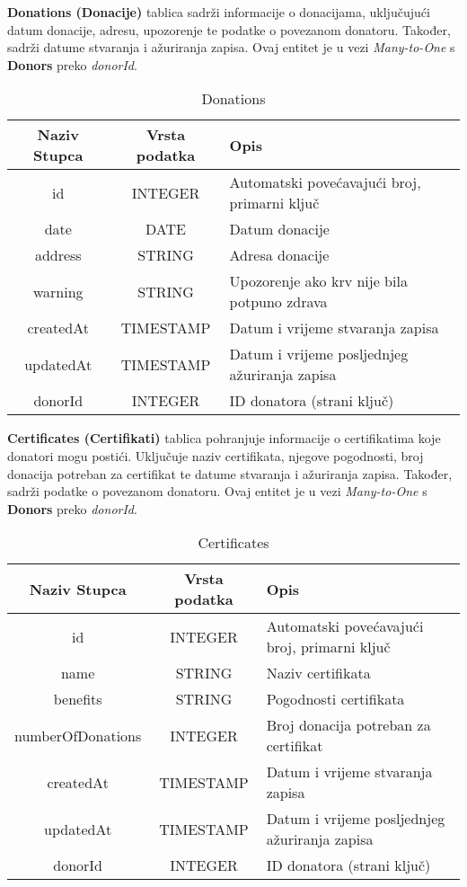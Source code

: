 \documentclass[12pt]{article}
\begin{document}
\noindent\textbf{Donations (Donacije)} tablica sadrži informacije o donacijama, uključujući datum donacije, adresu, upozorenje te podatke o povezanom donatoru. Također, sadrži datume stvaranja i ažuriranja zapisa. Ovaj entitet je u vezi \textit{Many-to-One} s \textbf{Donors} preko \textit{donorId}.
\begin{table}[H]
    \renewcommand{\arraystretch}{2}
    \centering
     \begin{tabularx}{1\textwidth}{|c|c|X|}
    \hline
    \textbf{Naziv Stupca} & \textbf{Vrsta podatka} & \textbf{Opis} \\
    \hline
    id & INTEGER & Automatski povećavajući broj, primarni ključ\\
    \hline
    date & DATE & Datum donacije \\
    \hline
    address & STRING & Adresa donacije \\
    \hline
    warning & STRING & Upozorenje ako krv nije bila potpuno zdrava \\
    \hline
    createdAt & TIMESTAMP & Datum i vrijeme stvaranja zapisa \\
    \hline
    updatedAt & TIMESTAMP & Datum i vrijeme posljednjeg ažuriranja zapisa \\
    \hline
    donorId & INTEGER & ID donatora (strani ključ) \\
    \hline
    \end{tabularx}
    \caption{Donations}
    \label{tab:my_label}
\end{table}
\clearpage %

\noindent\textbf{Certificates (Certifikati)} tablica pohranjuje informacije o certifikatima koje donatori mogu postići. Uključuje naziv certifikata, njegove pogodnosti, broj donacija potreban za certifikat te datume stvaranja i ažuriranja zapisa. Također, sadrži podatke o povezanom donatoru. Ovaj entitet je u vezi \textit{Many-to-One} s \textbf{Donors} preko \textit{donorId}.
\begin{table}[H]
    \renewcommand{\arraystretch}{2}
    \centering
     \begin{tabularx}{1\textwidth}{|c|c|X|}
    \hline
    \textbf{Naziv Stupca} & \textbf{Vrsta podatka} & \textbf{Opis} \\
    \hline
    id & INTEGER & Automatski povećavajući broj, primarni ključ\\
    \hline
    name & STRING & Naziv certifikata \\
    \hline
    benefits & STRING & Pogodnosti certifikata \\
    \hline
    numberOfDonations & INTEGER & Broj donacija potreban za certifikat \\
    \hline
    createdAt & TIMESTAMP & Datum i vrijeme stvaranja zapisa \\
    \hline
    updatedAt & TIMESTAMP & Datum i vrijeme posljednjeg ažuriranja zapisa \\
    \hline
    donorId & INTEGER & ID donatora (strani ključ) \\
    \hline
    \end{tabularx}
    \caption{Certificates}
    \label{tab:my_label}
\end{table}
\clearpage %
\end{document}
